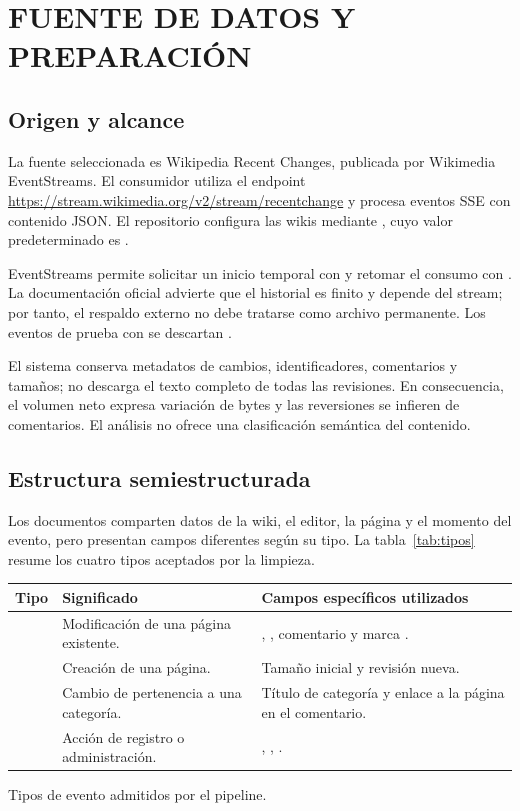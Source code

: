 \chapter{FUENTE DE DATOS Y PREPARACIÓN}
\label{cap:dataset}
\section{Origen y alcance}
La fuente seleccionada es Wikipedia Recent Changes, publicada por Wikimedia EventStreams. El consumidor utiliza el endpoint \url{https://stream.wikimedia.org/v2/stream/recentchange} y procesa eventos SSE con contenido JSON. El repositorio configura las wikis mediante , cuyo valor predeterminado es  \cite{repo}.

EventStreams permite solicitar un inicio temporal con  y retomar el consumo con . La documentación oficial advierte que el historial es finito y depende del stream; por tanto, el respaldo externo no debe tratarse como archivo permanente. Los eventos de prueba con  se descartan \cite{wikimedia}.

El sistema conserva metadatos de cambios, identificadores, comentarios y tamaños; no descarga el texto completo de todas las revisiones. En consecuencia, el volumen neto expresa variación de bytes y las reversiones se infieren de comentarios. El análisis no ofrece una clasificación semántica del contenido.

\section{Estructura semiestructurada}
Los documentos comparten datos de la wiki, el editor, la página y el momento del evento, pero presentan campos diferentes según su tipo. La tabla~\ref{tab:tipos} resume los cuatro tipos aceptados por la limpieza.

\begin{tabla}
\begin{tabularx}{\textwidth}{P{2.1cm}YY}
\toprule
Tipo & Significado & Campos específicos utilizados \\
\midrule
{} & Modificación de una página existente. & , , comentario y marca . \\
 & Creación de una página. & Tamaño inicial y revisión nueva. \\
 & Cambio de pertenencia a una categoría. & Título de categoría y enlace a la página en el comentario. \\
 & Acción de registro o administración. & , , . \\
\bottomrule
\end{tabularx}
\caption{Tipos de evento admitidos por el pipeline.}\label{tab:tipos}
\end{tabla}

